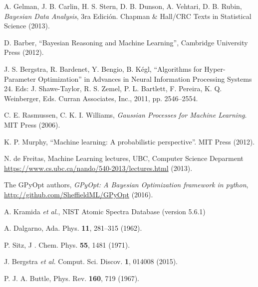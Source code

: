 \begin{thebibliography}{9}

A. Gelman, J. B. Carlin, H. S. Stern, D. B. Dunson, A. Vehtari, D. B. Rubin,
\textit{Bayesian Data Analysis}, 3ra Edición. 
Chapman \& Hall/CRC Texts in Statistical Science (2013).

D. Barber, 
``Bayesian Reasoning and Machine Learning'', 
Cambridge University Press (2012).

J. S. Bergstra, R. Bardenet, Y. Bengio, B. Kégl, 
``Algorithms for Hyper-Parameter Optimization'' in Advances in Neural 
Information Processing Systems 24. Eds: J. Shawe-Taylor, R. S. Zemel, 
P. L. Bartlett, F. Pereira, K. Q. Weinberger, Eds. Curran Associates, 
Inc., 2011, pp. 2546--2554. 

C. E. Rasmussen, C. K. I. Williams, 
\textit{Gaussian Processes for Machine Learning}. MIT Press (2006).

K. P. Murphy, 
``Machine learning: A probabilistic perspective''. 
MIT Press (2012).

N. de Freitas, 
Machine Learning lectures, UBC, Computer Science Deparment
\url{https://www.cs.ubc.ca/nando/540-2013/lectures.html} (2013).

The GPyOpt authors,
\textit{GPyOpt: A Bayesian Optimization framework in python},
\url{http://github.com/SheffieldML/GPyOpt} (2016).

A. Kramida \textit{et al.},
NIST Atomic Spectra Database (version 5.6.1) 

A. Dalgarno,
Ada. Phys. \textbf{11}, 281--315 (1962).

P. Sitz, 
J . Chem. Phys. \textbf{55}, 1481 (1971).

J. Bergstra \textit{et al.} 
Comput. Sci. Discov. \textbf{1}, 014008 (2015).

P. J. A. Buttle, 
Phys. Rev. \textbf{160}, 719 (1967).

\end{thebibliography}

